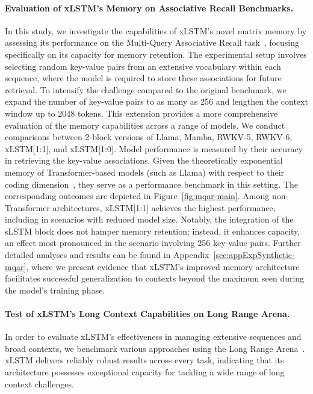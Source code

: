\paragraph{Evaluation of xLSTM's Memory on Associative Recall Benchmarks.} In this study, we investigate the capabilities of xLSTM's novel matrix memory by assessing its performance on the Multi-Query Associative Recall task~\citep{Arora:23arxiv}, focusing specifically on its capacity for memory retention. The experimental setup involves selecting random key-value pairs from an extensive vocabulary within each sequence, where the model is required to store these associations for future retrieval. To intensify the challenge compared to the original benchmark, we expand the number of key-value pairs to as many as 256 and lengthen the context window up to 2048 tokens. This extension provides a more comprehensive evaluation of the memory capabilities across a range of models. We conduct comparisons between 2-block versions of Llama, Mamba, RWKV-5, RWKV-6, xLSTM[1:1], and xLSTM[1:0]. Model performance is measured by their accuracy in retrieving the key-value associations. Given the theoretically exponential memory of Transformer-based models (such as Llama) with respect to their coding dimension~\citep{Ramsauer:21}, they serve as a performance benchmark in this setting. The corresponding outcomes are depicted in Figure~\ref{fig:mqar-main}. Among non-Transformer architectures, xLSTM[1:1] achieves the highest performance, including in scenarios with reduced model size. Notably, the integration of the sLSTM block does not hamper memory retention; instead, it enhances capacity, an effect most pronounced in the scenario involving 256 key-value pairs. Further detailed analyses and results can be found in Appendix~\ref{sec:appExpSynthetic-mqar}, where we present evidence that xLSTM's improved memory architecture facilitates successful generalization to contexts beyond the maximum seen during the model's training phase.

\paragraph{Test of xLSTM's Long Context Capabilities on Long Range Arena.} In order to evaluate xLSTM's effectiveness in managing extensive sequences and broad contexts, we benchmark various approaches using the Long Range Arena~\citep{Tay:21}. xLSTM delivers reliably robust results across every task, indicating that its architecture possesses exceptional capacity for tackling a wide range of long context challenges.


